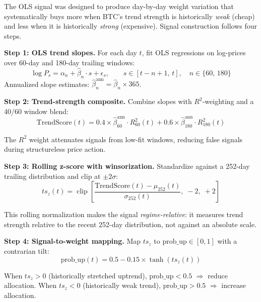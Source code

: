 \documentclass[11pt,letterpaper]{article}
\begin{document}
The OLS signal was designed to produce day-by-day weight variation that
systematically buys more when BTC's trend strength is historically \emph{weak}
(cheap) and less when it is historically \emph{strong} (expensive).  Signal
construction follows four steps.

\textbf{Step 1: OLS trend slopes.}  For each day $t$, fit OLS regressions on
log-prices over 60-day and 180-day trailing windows:
\begin{equation}
  \log P_s = \alpha_n + \hat{\beta}_n \cdot s + \epsilon_s,
  \qquad s \in [t-n+1,\, t],\quad n \in \{60,\, 180\}
\end{equation}
Annualized slope estimates: $\hat{\beta}_n^{\text{ann}} = \hat{\beta}_n \times 365$.

\textbf{Step 2: Trend-strength composite.}  Combine slopes with $R^2$-weighting
and a 40/60 window blend:
\begin{equation}
  \text{TrendScore}(t)
    = 0.4 \times \hat{\beta}_{60}^{\text{ann}} \cdot R^2_{60}(t)
    + 0.6 \times \hat{\beta}_{180}^{\text{ann}} \cdot R^2_{180}(t)
  \label{eq:trendscore}
\end{equation}

The $R^2$ weight attenuates signals from low-fit windows, reducing false signals
during structureless price action.

\textbf{Step 3: Rolling z-score with winsorization.}  Standardize against a
252-day trailing distribution and clip at $\pm2\sigma$:
\begin{equation}
  ts_z(t) = \operatorname{clip}\!\left[
    \frac{\text{TrendScore}(t) - \mu_{252}(t)}{\sigma_{252}(t)},\;
    -2,\; +2\right]
  \label{eq:tsz}
\end{equation}

This rolling normalization makes the signal \emph{regime-relative}: it measures
trend strength relative to the recent 252-day distribution, not against an
absolute scale.

\textbf{Step 4: Signal-to-weight mapping.}  Map $ts_z$ to $\text{prob\_up}
\in [0,1]$ with a contrarian tilt:
\begin{equation}
  \text{prob\_up}(t) = 0.5 - 0.15 \times \tanh(ts_z(t))
  \label{eq:prob_up}
\end{equation}

When $ts_z > 0$ (historically stretched uptrend), $\text{prob\_up} < 0.5$
$\Rightarrow$ reduce allocation.  When $ts_z < 0$ (historically weak trend),
$\text{prob\_up} > 0.5$ $\Rightarrow$ increase allocation.
\end{document}
